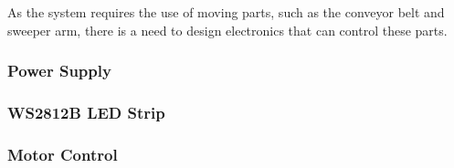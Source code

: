 As the system requires the use of moving parts, such as the conveyor belt and sweeper arm, there is a need to design electronics that can control these parts.


\subsubsection{Power Supply}

\subsubsection{WS2812B LED Strip}

\subsubsection{Motor Control}

